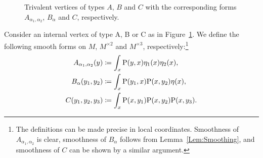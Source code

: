 \documentclass[\MainFolder/Text.tex]{subfiles}
\begin{document}
%
\begin{figure}[t]
\centering

\caption[Trivalent vertices of types $A$, $B$ and $C$.]{Trivalent vertices of types $A$, $B$ and $C$ with the corresponding forms $A_{\alpha_1,\alpha_2}$, $B_\alpha$ and $C$, respectively.}\label{Fig:Vertices}
\end{figure}
%
%
\begin{Definition}\label{Def:Contributions}
Consider an internal vertex of type A, B or C as in Figure~\ref{Fig:Vertices}. We define the following smooth forms on $M$, $M^{\times 2}$ and $M^{\times 3}$, respectively:\footnote{The definitions can be made precise in local coordinates. Smoothness of $A_{\alpha_1, \alpha_2}$ is clear, smoothness of $B_\alpha$ follows from Lemma~\ref{Lem:Smoothing}, and smoothness of $C$ can be shown by a similar argument.}
$$\begin{aligned} 
 A_{\alpha_1, \alpha_2}(y)&\coloneqq \int_x \mathrm{P}(y,x)\eta_1(x)\eta_2(x),\\ 
 B_\alpha(y_1,y_2) &\coloneqq \int_x \mathrm{P}(y_1,x)\mathrm{P}(x,y_2)\eta(x), \\
 C(y_1,y_2,y_3) &\coloneqq \int_x \mathrm{P}(x,y_1)\mathrm{P}(x,y_2)\mathrm{P}(x,y_3).
\end{aligned}$$
\end{Definition}
\end{document}
